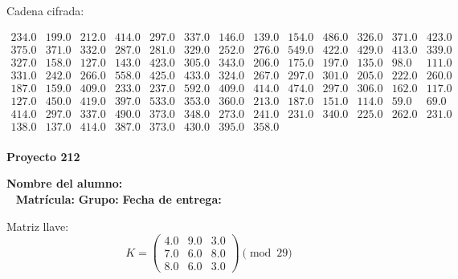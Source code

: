 \documentclass[12pt]{article}
\begin{document}
Cadena cifrada:
\begin{center}
$\begin{array}{lllllllllllll}
234.0 & 199.0 & 212.0 & 414.0 & 297.0 & 337.0 & 146.0 & 139.0 & 154.0 & 486.0 & 326.0 & 371.0 & 423.0\\
375.0 & 371.0 & 332.0 & 287.0 & 281.0 & 329.0 & 252.0 & 276.0 & 549.0 & 422.0 & 429.0 & 413.0 & 339.0\\
327.0 & 158.0 & 127.0 & 143.0 & 423.0 & 305.0 & 343.0 & 206.0 & 175.0 & 197.0 & 135.0 & 98.0 & 111.0\\
331.0 & 242.0 & 266.0 & 558.0 & 425.0 & 433.0 & 324.0 & 267.0 & 297.0 & 301.0 & 205.0 & 222.0 & 260.0\\
187.0 & 159.0 & 409.0 & 233.0 & 237.0 & 592.0 & 409.0 & 414.0 & 474.0 & 297.0 & 306.0 & 162.0 & 117.0\\
127.0 & 450.0 & 419.0 & 397.0 & 533.0 & 353.0 & 360.0 & 213.0 & 187.0 & 151.0 & 114.0 & 59.0 & 69.0\\
414.0 & 297.0 & 337.0 & 490.0 & 373.0 & 348.0 & 273.0 & 241.0 & 231.0 & 340.0 & 225.0 & 262.0 & 231.0\\
138.0 & 137.0 & 414.0 & 387.0 & 373.0 & 430.0 & 395.0 & 358.0\\
\end{array}$
\end{center}

\newpage


\textbf{Proyecto 212}

\textbf{Nombre del alumno:} \underline{\hspace{13cm}}\\\
\vspace{1cm}
\textbf{Matrícula:} \underline{\hspace{4cm}} \hspace{1cm}
\textbf{Grupo:} \underline{\hspace{2cm}}
\textbf{Fecha de entrega:} \underline{\hspace{2cm}}

\medskip

Matriz llave:
\[
K = \begin{pmatrix}
4.0 & 9.0 & 3.0\\
7.0 & 6.0 & 8.0\\
8.0 & 6.0 & 3.0
\end{pmatrix} \pmod{29}
\]
\end{document}
